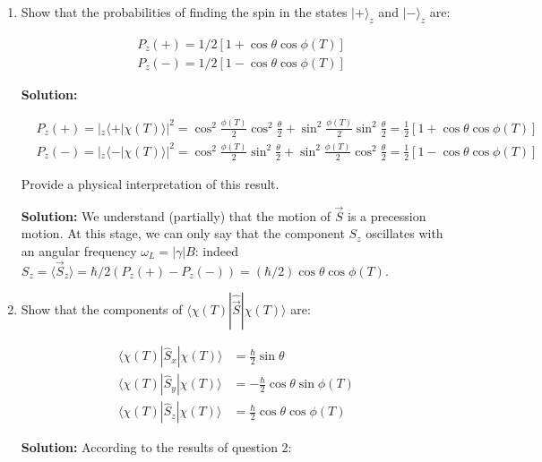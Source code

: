 \documentclass{article}
\begin{document}
\begin{enumerate}
    \item Show that the probabilities of finding the spin in the states $|+\rangle_{z}$ and $|-\rangle_{z}$ are:

    $$
    \begin{aligned}
    & P_{z}(+) = 1 / 2[1 + \cos \theta \cos \phi(T)] \\
    & P_{z}(-) = 1 / 2[1 - \cos \theta \cos \phi(T)]
    \end{aligned}
    $$

    {\color{red}\textbf{Solution:}

    $$
    \begin{aligned}
    & P_{z}(+) = \left|{ }_{z}\langle+| \chi(T)\rangle\right|^{2} = \cos ^{2} \frac{\phi(T)}{2} \cos ^{2} \frac{\theta}{2} + \sin ^{2} \frac{\phi(T)}{2} \sin ^{2} \frac{\theta}{2} = \frac{1}{2}[1 + \cos \theta \cos \phi(T)] \\
    & P_{z}(-) = \left|{ }_{z}\langle-| \chi(T)\rangle\right|^{2} = \cos ^{2} \frac{\phi(T)}{2} \sin ^{2} \frac{\theta}{2} + \sin ^{2} \frac{\phi(T)}{2} \cos ^{2} \frac{\theta}{2} = \frac{1}{2}[1 - \cos \theta \cos \phi(T)]
    \end{aligned}
    $$}

    Provide a physical interpretation of this result.

    {\color{red}\textbf{Solution:} We understand (partially) that the motion of $\vec{S}$ is a precession motion. At this stage, we can only say that the component $S_{z}$ oscillates with an angular frequency $\omega_{L} = |\gamma| B$: indeed $S_{z} = \langle\vec{S}_{z}\rangle = \hbar / 2\left(P_{z}(+) - P_{z}(-)\right) = (\hbar / 2) \cos \theta \cos \phi(T)$.}

    \item Show that the components of $\langle\chi(T)| \hat{\vec{S}}|\chi(T)\rangle$ are:

    $$
    \begin{aligned}
    \langle\chi(T)| \hat{S}_{x}|\chi(T)\rangle & = \frac{\hbar}{2} \sin \theta \\
    \langle\chi(T)| \hat{S}_{y}|\chi(T)\rangle & = -\frac{\hbar}{2} \cos \theta \sin \phi(T) \\
    \langle\chi(T)| \hat{S}_{z}|\chi(T)\rangle & = \frac{\hbar}{2} \cos \theta \cos \phi(T)
    \end{aligned}
    $$

    {\color{red}\textbf{Solution:} According to the results of question 2:

}
\end{enumerate}
\end{document}
